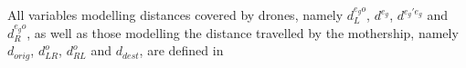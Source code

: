 \noindent
All variables modelling  distances covered by drones, namely $d_L^{e_go}$, $d^{e_g}$, $d^{e_g'e_g}$ and $d_R^{e_go}$,  as well as those modelling the distance travelled by the mothership, namely $d_{orig}$, $d_{LR}^o$, $d_{RL}^o$ and $d_{dest}$, are defined in  
 
 
 

